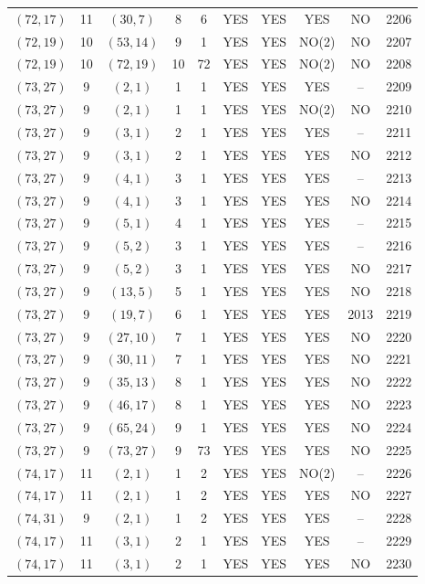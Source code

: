\begin{longtable}{|c|c|c|c|c|c|c|c|c|c|}
$(72, 17)$ & 11 & $(30, 7)$ & 8 & 6 & YES & YES & YES & NO & 2206\\
$(72, 19)$ & 10 & $(53, 14)$ & 9 & 1 & YES & YES & NO(2) & NO & 2207\\
$(72, 19)$ & 10 & $(72, 19)$ & 10 & 72 & YES & YES & NO(2) & NO & 2208\\
$(73, 27)$ & 9 & $(2, 1)$ & 1 & 1 & YES & YES & YES & -- & 2209\\
$(73, 27)$ & 9 & $(2, 1)$ & 1 & 1 & YES & YES & NO(2) & NO & 2210\\
$(73, 27)$ & 9 & $(3, 1)$ & 2 & 1 & YES & YES & YES & -- & 2211\\
$(73, 27)$ & 9 & $(3, 1)$ & 2 & 1 & YES & YES & YES & NO & 2212\\
$(73, 27)$ & 9 & $(4, 1)$ & 3 & 1 & YES & YES & YES & -- & 2213\\
$(73, 27)$ & 9 & $(4, 1)$ & 3 & 1 & YES & YES & YES & NO & 2214\\
$(73, 27)$ & 9 & $(5, 1)$ & 4 & 1 & YES & YES & YES & -- & 2215\\
$(73, 27)$ & 9 & $(5, 2)$ & 3 & 1 & YES & YES & YES & -- & 2216\\
$(73, 27)$ & 9 & $(5, 2)$ & 3 & 1 & YES & YES & YES & NO & 2217\\
$(73, 27)$ & 9 & $(13, 5)$ & 5 & 1 & YES & YES & YES & NO & 2218\\
$(73, 27)$ & 9 & $(19, 7)$ & 6 & 1 & YES & YES & YES & 2013 & 2219\\
$(73, 27)$ & 9 & $(27, 10)$ & 7 & 1 & YES & YES & YES & NO & 2220\\
$(73, 27)$ & 9 & $(30, 11)$ & 7 & 1 & YES & YES & YES & NO & 2221\\
$(73, 27)$ & 9 & $(35, 13)$ & 8 & 1 & YES & YES & YES & NO & 2222\\
$(73, 27)$ & 9 & $(46, 17)$ & 8 & 1 & YES & YES & YES & NO & 2223\\
$(73, 27)$ & 9 & $(65, 24)$ & 9 & 1 & YES & YES & YES & NO & 2224\\
$(73, 27)$ & 9 & $(73, 27)$ & 9 & 73 & YES & YES & YES & NO & 2225\\
$(74, 17)$ & 11 & $(2, 1)$ & 1 & 2 & YES & YES & NO(2) & -- & 2226\\
$(74, 17)$ & 11 & $(2, 1)$ & 1 & 2 & YES & YES & YES & NO & 2227\\
$(74, 31)$ & 9 & $(2, 1)$ & 1 & 2 & YES & YES & YES & -- & 2228\\
$(74, 17)$ & 11 & $(3, 1)$ & 2 & 1 & YES & YES & YES & -- & 2229\\
$(74, 17)$ & 11 & $(3, 1)$ & 2 & 1 & YES & YES & YES & NO & 2230\\

\end{longtable}
